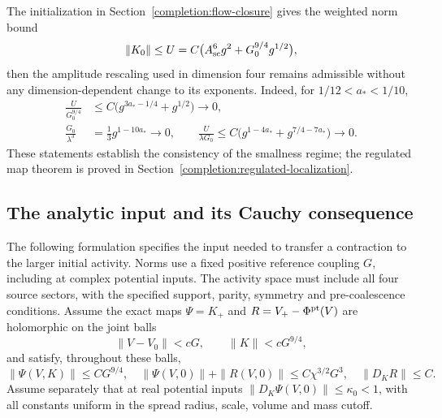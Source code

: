 \documentclass[11pt]{article}
\begin{document}
The initialization in Section~\ref{completion:flow-closure} gives the weighted norm bound
\[
 \|K_0\|\le U=C\bigl(A_{\rm sc}^6g^2+
                    G_0^{9/4}g^{1/2}\bigr),
\]
then the amplitude rescaling used in dimension four remains admissible
without any dimension-dependent change to its exponents. Indeed, for
\(1/12<a_*<1/10\),
\begin{align}
 \frac{U}{G_0^{9/4}}
   &\le C\bigl(g^{3a_*-1/4}+g^{1/2}\bigr)\longrightarrow0,
      \label{frac:eq:seed-small}\\
 \frac{G_0}{\lambda^3}
   &=\frac13g^{1-10a_*}\longrightarrow0,\qquad
 \frac{U}{\lambda G_0}
   \le C\bigl(g^{1-4a_*}+g^{7/4-7a_*}\bigr)
        \longrightarrow0.
      \label{frac:eq:seed-ratios}
\end{align}
These statements establish the consistency of the smallness regime;
the regulated map theorem is proved in Section~\ref{completion:regulated-localization}.

\subsection{The analytic input and its Cauchy consequence}
The following formulation specifies the input needed to transfer a
contraction to the larger initial activity. Norms use a fixed positive
reference coupling \(G\), including at complex potential inputs.
The activity space must include all four source sectors, with the
specified support, parity, symmetry and pre-coalescence conditions.
Assume the exact maps \(\Psi=K_+\) and
\(R=V_+-\Phi^{\rm pt}(V)\) are holomorphic on the joint balls
\[
 \|V-V_0\|<cG,\qquad \|K\|<cG^{9/4},
\]
and satisfy, throughout these balls,
\begin{equation}\label{frac:eq:analytic-input}
 \|\Psi(V,K)\|\le CG^{9/4},\quad
 \|\Psi(V,0)\|+\|R(V,0)\|\le C\chi^{3/2}G^3,
 \quad \|D_KR\|\le C.
\end{equation}
Assume separately that at real potential inputs
\(\|D_K\Psi(V,0)\|\le\kappa_0<1\), with all constants uniform
in the spread radius, scale, volume and mass cutoff.
\end{document}
